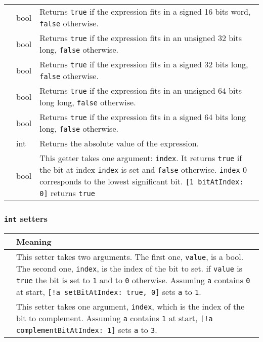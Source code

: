\documentclass[11pt]{article}
\begin{document}
\begin{longtable}{>{\ttfamily}l|l|p{3.13in}}
 {fitsSignedInWord}&
  {bool}&
  {Returns \texttt{true} if the expression fits in a signed 16 bits word, \texttt{false} otherwise.}\\
 {fitsUnsignedInLong}&
  {bool}&
  {Returns \texttt{true} if the expression fits in an unsigned 32 bits long, \texttt{false} otherwise.}\\
 {fitsSignedInLong}&
  {bool}&
  {Returns \texttt{true} if the expression fits in a signed 32 bits long, \texttt{false} otherwise.}\\
 {fitsUnsignedInLongLong}&
  {bool}&
  {Returns \texttt{true} if the expression fits in an unsigned 64 bits long long, \texttt{false} otherwise.}\\
 {fitsSignedInLongLong}&
  {bool}&
  {Returns \texttt{true} if the expression fits in a signed 64 bits long long, \texttt{false} otherwise.}\\
 {abs}&
  {int}&
  {Returns the absolute value of the expression.}\\
 {bitAtIndex}&
  {bool}&
  {This getter takes one argument: \texttt{index}. It returns \texttt{true} if the bit at index \texttt{index} is set and \texttt{false} otherwise. \texttt{index} 0 corresponds to the lowest significant bit. \texttt{[1 bitAtIndex: 0]} returns \texttt{true}}\\
\end{longtable}

\subsubsection{\lstinline{int} setters}

\begin{longtable}{>{\ttfamily}l|p{3.84in}}
{\bf setter}&{\bf Meaning}\\
\hline\endhead
 {setBitAtIndex}&
  {This setter takes two arguments. The first one, \texttt{value}, is a bool. The second one, \texttt{index}, is the index of the bit to set. if \texttt{value} is \texttt{true} the bit is set to \texttt{1} and to \texttt{0} otherwise. Assuming \texttt{a} contains \texttt{0} at start, \texttt{[!a setBitAtIndex: true, 0]} sets \texttt{a} to \texttt{1}.}\\
 {complementBitAtIndex}&
  {This setter takes one argument, \texttt{index}, which is the index of the bit to complement.  Assuming \texttt{a} contains \texttt{1} at start, \texttt{[!a complementBitAtIndex: 1]} sets \texttt{a} to \texttt{3}.}\\
\end{longtable}
\end{document}
